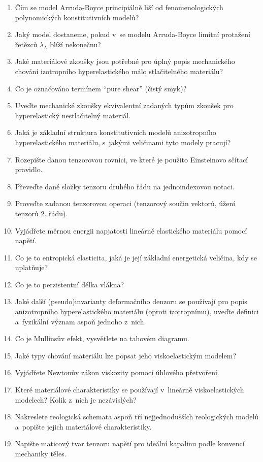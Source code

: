 \begin{enumerate}
	\item Čím se model Arruda-Boyce principiálně liší od fenomenologických polynomických konstitutivních modelů?
	\item Jaký model dostaneme, pokud v~se modelu Arruda-Boyce limitní protažení řetězců $\lambda_L$ blíží nekonečnu?
	\item Jaké materiálové zkoušky jsou potřebné pro úplný popis mechanického chování izotropního hyperelastického málo stlačitelného materiálu?
	\item Co je označováno termínem \enquote{pure shear} (čistý smyk)?
	\item Uveďte mechanické zkoušky ekvivalentní zadaných typům zkoušek pro hyperelastický nestlačitelný materiál.
	\item Jaká je základní struktura konstitutivních modelů anizotropního hyperelastického materiálu, s~jakými veličinami tyto modely pracují?
	\item Rozepište danou tenzorovou rovnici, ve které je použito Einsteinovo sčítací pravidlo.
	\item Převeďte dané složky tenzoru druhého řádu na jednoindexovou notaci.
	\item Proveďte zadanou tenzorovou operaci (tenzorový součin vektorů, úžení tenzorů 2. řádu).
	\item Vyjádřete měrnou energii napjatosti lineárně elastického materiálu pomocí napětí.
	\item Co je to entropická elasticita, jaká je její základní energetická veličina, kdy se uplatňuje?
	\item Co je to perzistentní délka vlákna?
	\item Jaké další (pseudo)invarianty deformačního denzoru se používají pro popis anizotropního hyperelastického materiálu (oproti izotropnímu), uveďte definici a~fyzikální význam aspoň jednoho z~nich.
	\item Co je Mullinsův efekt, vysvětlete na tahovém diagramu.
	\item Jaké typy chování materiálu lze popsat jeho viskoelastickým modelem?
	\item Vyjádřete Newtonův zákon viskozity pomocí úhlového přetvoření.
	\item Které materiálové charakteristiky se používají v~lineárně viskoelastických modelech? Kolik z~nich je nezávislých?
	\item Nakreslete reologická schemata aspoň tří nejjednodušších reologických modelů a~popište jejich materiálové charakteristiky.
	\item Napište maticový tvar tenzoru napětí pro ideální kapalinu podle konvencí mechaniky těles.

\end{enumerate}
